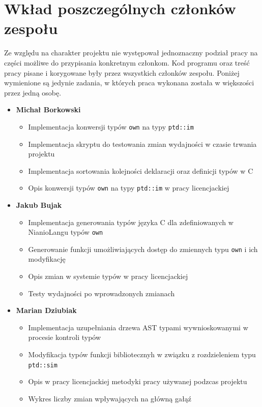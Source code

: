 \documentclass[licencjacka]{pracamgr}
\begin{document}
\chapter{Wkład poszczególnych członków zespołu}
Ze względu na charakter projektu nie występował jednoznaczny podział pracy na części możliwe do przypisania konkretnym członkom.
Kod programu oraz treść pracy pisane i korygowane były przez wszystkich członków zespołu. Poniżej wymienione są jedynie zadania,
w których praca wykonana została w większości przez jedną osobę.
\begin{itemize}
  \item[] \textbf{Michał Borkowski}
  \begin{itemize}
   \item Implementacja konwersji typów \texttt{own} na typy \texttt{ptd::im}
   \item Implementacja skryptu do testowania zmian wydajności w czasie trwania projektu
   \item Implementacja sortowania kolejności deklaracji oraz definicji typów w C
   \item Opis konwersji typów \texttt{own} na typy \texttt{ptd::im} w pracy licencjackiej
  \end{itemize}

  \item[] \textbf{Jakub Bujak}
  \begin{itemize}
   \item Implementacja generowania typów języka C dla zdefiniowanych w NianioLangu typów \texttt{own}
   \item Generowanie funkcji umożliwiających dostęp do zmiennych typu \texttt{own} i ich modyfikację
   \item Opis zmian w systemie typów w pracy licencjackiej
   \item Testy wydajności po wprowadzonych zmianach
  \end{itemize}

  \item[] \textbf{Marian Dziubiak}
  \begin{itemize}
   \item Implementacja uzupełniania drzewa AST typami wywnioskowanymi w procesie kontroli typów
   \item Modyfikacja typów funkcji bibliotecznyh w związku z rozdzieleniem typu \texttt{ptd::sim}
   \item Opis w pracy licencjackiej metodyki pracy używanej podzcas projektu
   \item Wykres liczby zmian wpływających na główną gałąź 
  \end{itemize}


\end{itemize}
\end{document}
